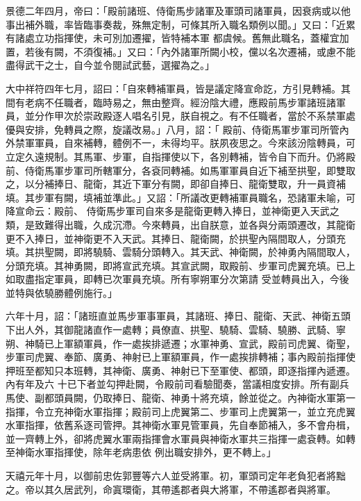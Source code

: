 \begin{pinyinscope}
 景德二年四月，帝曰：「殿前諸班、侍衛馬步諸軍及軍頭司諸軍員，因衰病或以他事出補外職，率皆臨事奏裁，殊無定制，可條其所入職名類例以聞。」又曰：「近累有諸處立功指揮使，未可別加遷擢，皆特補本軍
 都虞候。舊無此職名，蓋權宜加置，若後有闕，不須復補。」又曰：「內外諸軍所闕小校，儻以名次遷補，或慮不能盡得武干之士，自今並令閱試武藝，選擢為之。」



 大中祥符四年七月，詔曰：「自來轉補軍員，皆是議定降宣命訖，方引見轉補。其間有老病不任職者，臨時易之，無由整齊。經汾陰大禮，應殿前馬步軍諸班諸軍員，並分作甲次於崇政殿逐人唱名引見，朕自視之。有不任職者，當於不系禁軍處優與安排，免轉員之際，旋議改易。」八月，詔：「
 殿前、侍衛馬軍步軍司所管內外禁軍軍員，自來補轉，體例不一，未得均平。朕夙夜思之。今來該汾陰轉員，可立定久遠規制。其馬軍、步軍，自指揮使以下，各別轉補，皆令自下而升。仍將殿前、侍衛馬軍步軍司所轄軍分，各袞同轉補。如馬軍軍員自近下補至拱聖，即雙取之，以分補捧日、龍衛，其近下軍分有闕，即卻自捧日、龍衛雙取，升一員資補填。其步軍有闕，填補並準此。」又詔：「所議改更轉補軍員職名，恐諸軍未喻，可降宣命云：殿前、
 侍衛馬步軍司自來多是龍衛更轉入捧日，並神衛更入天武之類，是致難得出職，久成沉滯。今來轉員，出自朕意，並各與分兩頭遷改，其龍衛更不入捧日，並神衛更不入天武。其捧日、龍衛闕，於拱聖內隔間取人，分頭充填。其拱聖闕，即將驍騎、雲騎分頭轉入。其天武、神衛闕，於神勇內隔間取人，分頭充填。其神勇闕，即將宣武充填。其宣武闕，取殿前、步軍司虎翼充填。已上如取盡指定軍員，即轉已次軍員充填。所有寧朔軍分次第請
 受並轉員出入，今後並特與依驍勝體例施行。」



 六年十月，詔：「諸班直並馬步軍事軍員，其諸班、捧日、龍衛、天武、神衛五頭下出人外，其御龍諸直作一處轉；員僚直、拱聖、驍騎、雲騎、驍勝、武騎、寧朔、神騎已上軍額軍員，作一處挨排遞遷；水軍神勇、宣武，殿前司虎翼、衛聖，步軍司虎翼、奉節、廣勇、神射已上軍額軍員，作一處挨排轉補；事內殿前指揮使押班至都知只本班轉，其神衛、廣勇、神射已下至軍使、都頭，即逐指揮內遞遷。內有年及六
 十已下者並勾押赴闕，令殿前司看驗聞奏，當議相度安排。所有副兵馬使、副都頭員闕，仍取捧日、龍衛、神勇十將充填，餘並從之。內神衛水軍第一指揮，令立充神衛水軍指揮；殿前司上虎翼第二、步軍司上虎翼第一，並立充虎翼水軍指揮，依舊系逐司管押。其神衛水軍見管軍員，先自奉節補入，多不會舟楫，並一齊轉上外，卻將虎翼水軍兩指揮會水軍員與神衛水軍共三指揮一處袞轉。如轉至神衛水軍指揮使，除年老病患依
 例出職安排外，更不轉上。」



 天禧元年十月，以御前忠佐郭豐等六人並受將軍。初，軍頭司定年老負犯者將黜之。帝以其久居武列，命寘環衛，其帶遙郡者與大將軍，不帶遙郡者與將軍。




\end{pinyinscope}
